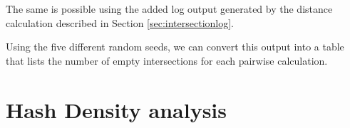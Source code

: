 The same is possible using the added log output generated by the distance
calculation described in Section \ref{sec:intersectionlog}.

Using the five different random seeds, we can convert this output into a table
that lists the number of empty intersections for each pairwise calculation. 



\section{Hash Density analysis}
